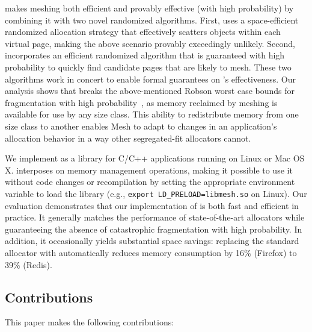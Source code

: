 \Mesh makes meshing both efficient and provably effective (with high
probability) by combining it with two novel randomized
algorithms. First, \Mesh uses a space-efficient randomized
allocation strategy that effectively scatters objects within each
virtual page, making the above scenario provably exceedingly
unlikely. Second, \Mesh incorporates an efficient randomized
algorithm that is guaranteed with high probability to quickly find
candidate pages that are likely to mesh. These two algorithms work in
concert to enable formal guarantees on \Mesh's effectiveness. Our
analysis shows that \Mesh breaks the above-mentioned Robson worst
case bounds for fragmentation with high
probability~\cite{robson:1977:worstcasefrag}, as memory reclaimed by meshing is available for use by any size class.
This ability to redistribute memory from one size class to another enables Mesh to adapt to changes in an application's allocation behavior in a way other segregated-fit allocators cannot.


We implement \Mesh as a library for C/C++ applications running on
Linux or Mac OS X. \Mesh{} interposes on memory management operations,
making it possible to use it without code changes or
recompilation by setting the appropriate environment variable to load
the \Mesh{} library (e.g., \texttt{export
  LD\_PRELOAD=libmesh.so} on Linux). Our evaluation demonstrates that
our implementation of \Mesh{} is both fast and efficient in
practice. It generally matches the performance of state-of-the-art
allocators while guaranteeing the absence of catastrophic
fragmentation with high probability. In addition, it occasionally
yields substantial space savings: replacing the standard allocator
with \Mesh{} automatically reduces memory consumption by 16\%
(Firefox) to 39\% (Redis).


\subsection{Contributions}
\label{sec:contributions}

This paper makes the following contributions:


